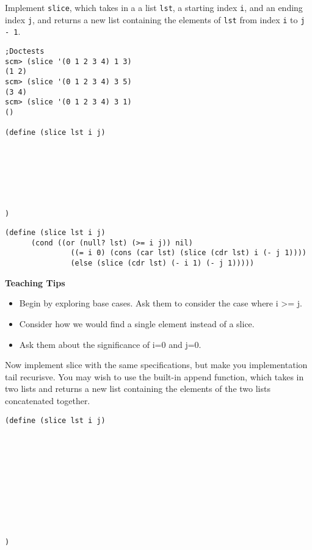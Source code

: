\begin{blocksection}

\question Implement \texttt{slice}, which takes in a a list \texttt{lst}, a starting index \texttt{i}, and an ending index \texttt{j},
and returns a new list containing the elements of \texttt{lst} from index \texttt{i} to \texttt{j - 1}.

\begin{lstlisting}
;Doctests
scm> (slice '(0 1 2 3 4) 1 3)
(1 2)
scm> (slice '(0 1 2 3 4) 3 5)
(3 4)
scm> (slice '(0 1 2 3 4) 3 1)
()

(define (slice lst i j)
    






)
\end{lstlisting}

\end{blocksection}
\begin{blocksection}

\begin{solution}
\begin{lstlisting}
(define (slice lst i j)
      (cond ((or (null? lst) (>= i j)) nil)
               ((= i 0) (cons (car lst) (slice (cdr lst) i (- j 1))))
               (else (slice (cdr lst) (- i 1) (- j 1)))))
\end{lstlisting}
\end{solution}

\end{blocksection}

\begin{blocksection}
\begin{guide}
\textbf{Teaching Tips}
\begin{itemize}
	\item Begin by exploring base cases. Ask them to consider the case where i >= j.
	\item Consider how we would find a single element instead of a slice.
	\item Ask them about the significance of i=0 and j=0.
\end{itemize}
\end{guide}
\end{blocksection}


\begin{blocksection}

\question Now implement slice with the same specifications, but make you implementation tail recurisve.
\newline
You may wish to use the built-in append function, which takes in two lists and returns a 
new list containing the elements of the two lists concatenated together.

\begin{lstlisting}
(define (slice lst i j)
    










)
\end{lstlisting}
\end{blocksection}

